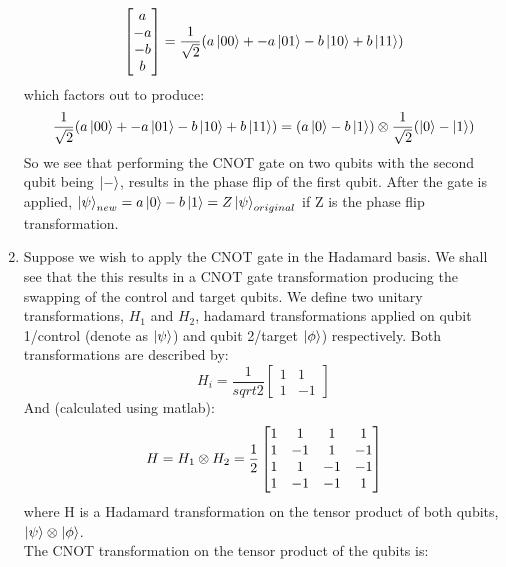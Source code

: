 \documentclass{article}
\newcommand{\tens}[1]{%
  \mathbin{\mathop{\otimes}\displaylimits_{#1}}%
}
\begin{document}
\begin{enumerate}
\begin{equation}
\begin{bmatrix}
            a\\-a\\-b\\b
            \end{bmatrix} = \frac{1}{\sqrt{2}}(a\ket{00}+-a\ket{01}-b\ket{10}+b\ket{11})
        \end{equation}
        which factors out to produce:
        \begin{equation}
            \frac{1}{\sqrt{2}}(a\ket{00}+-a\ket{01}-b\ket{10}+b\ket{11} )= (a\ket{0}-b\ket{1})\tens{}\frac{1}{\sqrt{2}}(\ket{0}-\ket{1})
        \end{equation}
        So  we see that performing the CNOT gate on two qubits with the second qubit being $\ket{-}$, results in the phase flip of the first qubit. After the gate is applied, $\ket{\psi}_{new} = a\ket{0}-b\ket{1} = Z\ket{\psi}_{original}$ if Z is the phase flip transformation.
        \item Suppose we wish to apply the CNOT gate in the Hadamard basis. We shall see that the this results in a CNOT gate transformation producing the swapping of the control and target qubits. We define two unitary transformations, $H_1$ and $H_2$, hadamard transformations applied on qubit 1/control (denote as $\ket{\psi}$) and qubit 2/target $\ket{\phi}$) respectively. Both transformations are described by:
        \begin{equation}
            H_i = \frac{1}{sqrt{2}}
            \begin{bmatrix}
            1 & 1 \\ 1 & -1
            \end{bmatrix}
        \end{equation}
        And (calculated using matlab): 
        \begin{equation}
            H = H_1\tens{} H_2 = \frac{1}{2}
            \begin{bmatrix}
            1 &    1  &   1    & 1\\
            1   & -1    & 1 &    -1\\
            1    & 1   & -1   & -1\\
             1   & -1 &    -1   &  1\\
            \end{bmatrix}
        \end{equation}
        where H is a Hadamard transformation on the tensor product of both qubits, $\ket{\psi}\tens{}\ket{\phi}$.\\ The CNOT transformation on the tensor product of the qubits is:

\end{enumerate}
\end{document}
